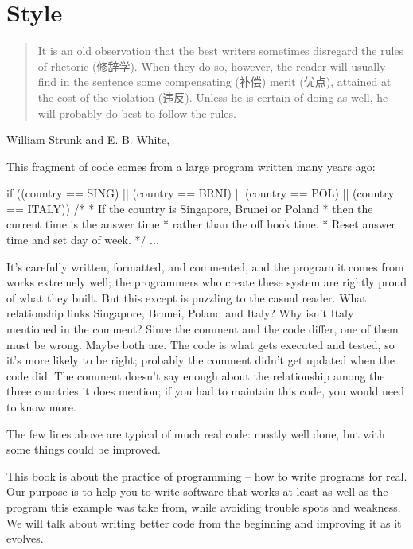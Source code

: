 \chapter{Style}
\label{chap:style}
\begin{quote}
    It is an old observation that the best writers sometimes disregard the
    rules of rhetoric (修辞学). When they do so, however, the reader will
    usually find in the sentence some compensating (补偿) merit (优点),
    attained at the cost of the violation (违反). Unless he is certain of
    doing as well, he will probably do best to follow the rules.
\end{quote}

\begin{quotesrc}
    William Strunk and E. B. White, 
\end{quotesrc}

This fragment of code comes from a large program written many years ago:
\begin{wellcode}
    if ((country == SING) || (country == BRNI) ||
        (country == POL) || (country == ITALY))
    {
        /*
         * If the country is Singapore, Brunei or Poland
         * then the current time is the answer time 
         * rather than the off hook time.
         * Reset answer time and set day of week.
         */
         ...
    }
\end{wellcode}

It's carefully written, formatted, and commented, and the program it comes
from works extremely well; the programmers who create these system are
rightly proud of what they built. But this except is puzzling to the casual
reader. What relationship links Singapore, Brunei, Poland and Italy? Why
isn't Italy mentioned in the comment? Since the comment and the code
differ, one of them must be wrong. Maybe both are. The code is what gets
executed and tested, so it's more likely to be right; probably the comment
didn't get updated when the code did. The comment doesn't say enough about
the relationship among the three countries it does mention; if you had to
maintain this code, you would need to know more.

The few lines above are typical of much real code: mostly well done, but
with some things could be improved.

This book is about the practice of programming -- how to write programs for
real. Our purpose is to help you to write software that works at least as
well as the program this example was take from, while avoiding trouble
spots and weakness. We will talk about writing better code from the
beginning and improving it as it evolves.

